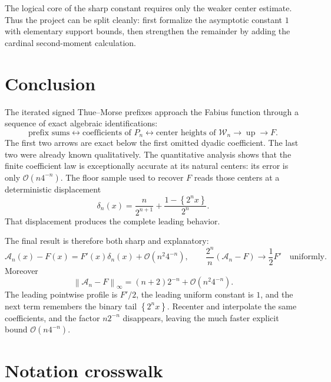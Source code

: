 \documentclass[11pt,oneside]{article}
\theoremstyle{definition}
\theoremstyle{remark}
\newcommand{\Up}{\operatorname{up}}
\newcommand{\bigO}{\mathcal O}
\newcommand{\norm}[1]{\left\lVert #1\right\rVert}
\newcommand{\fracpart}[1]{\left\{#1\right\}}
\begin{document}
The logical core of the sharp constant requires only the weaker center estimate.
Thus the project can be split cleanly: first formalize the asymptotic constant
$1$ with elementary support bounds, then strengthen the remainder by adding the
cardinal second-moment calculation.

\section{Conclusion}
\label{sec:conclusion}

The iterated signed Thue--Morse prefixes approach the Fabius function through a
sequence of exact algebraic identifications:
\begin{equation*}
 \text{prefix sums}
 \longleftrightarrow
 \text{coefficients of }P_n
 \longleftrightarrow
 \text{center heights of }\mathcal W_n
 \longrightarrow \Up
 \longrightarrow F.
\end{equation*}
The first two arrows are exact below the first omitted dyadic coefficient.  The
last two were already known qualitatively.  The quantitative analysis shows that
the finite coefficient law is exceptionally accurate at its natural centers:
its error is only $\bigO(n4^{-n})$.  The floor sample used to recover $F$ reads
those centers at a deterministic displacement
\begin{equation*}
 \delta_n(x)=\frac{n}{2^{n+1}}+
 \frac{1-\fracpart{2^n x}}{2^n}.
\end{equation*}
That displacement produces the complete leading behavior.

The final result is therefore both sharp and explanatory:
\begin{equation*}
 \mathcal A_n(x)-F(x)
 =F'(x)\delta_n(x)+\bigO(n^2 4^{-n}),
 \qquad
 \frac{2^n}{n}(\mathcal A_n-F)\longrightarrow\frac12F'
 \quad\text{uniformly}.
\end{equation*}
Moreover
\begin{equation*}
 \norm{\mathcal A_n-F}_\infty
 =(n+2)2^{-n}+\bigO(n^2 4^{-n}).
\end{equation*}
The leading pointwise profile is $F'/2$, the leading uniform constant is $1$,
and the next term remembers the binary tail $\fracpart{2^n x}$.  Recenter
and interpolate the same coefficients, and the factor $n2^{-n}$ disappears,
leaving the much faster explicit bound $\bigO(n4^{-n})$.

\appendix

\section{Notation crosswalk}
\label{app:notation}
\end{document}
